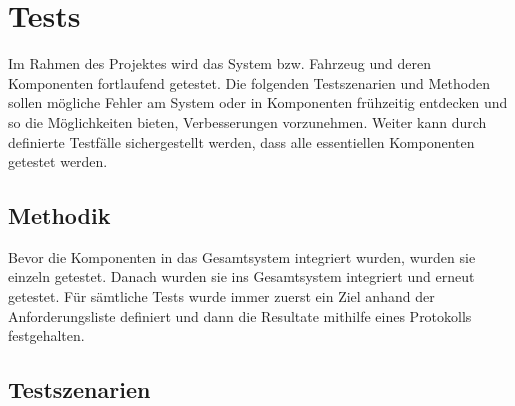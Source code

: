 \documentclass[a4paper]{report}
\begin{document}
\chapter{Tests}
\label{sec:TestsPrototyp}

Im Rahmen des Projektes wird das System bzw. Fahrzeug und deren Komponenten fortlaufend
getestet. Die folgenden Testszenarien und Methoden sollen mögliche Fehler am System oder in
Komponenten frühzeitig entdecken und so die Möglichkeiten bieten, Verbesserungen
vorzunehmen. Weiter kann durch definierte Testfälle sichergestellt werden, dass alle essentiellen
Komponenten getestet werden.

\section{Methodik}

Bevor die Komponenten in das Gesamtsystem integriert wurden, wurden sie einzeln getestet. Danach wurden sie ins Gesamtsystem integriert und erneut getestet. Für sämtliche Tests wurde immer zuerst ein Ziel anhand der Anforderungsliste definiert und dann die Resultate mithilfe eines Protokolls festgehalten.

\section{Testszenarien}
\end{document}
